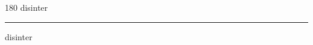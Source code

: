 
\begin{frame}
\begin{center}
\begin{turn}{180}
{\fontsize{2.5cm}{1em}\selectfont disinter}
\end{turn}
\vspace{1em}\par  
\hrule
\vspace{1em}\par  
{\fontsize{2.5cm}{1em}\selectfont disinter}
\end{center}
\end{frame}
